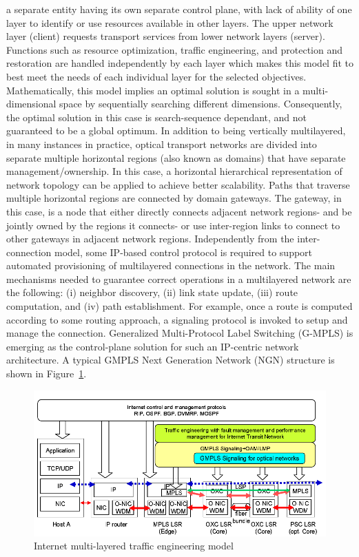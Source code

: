 a separate entity having its own separate control plane, with lack of ability of one layer to identify or use resources available in other layers. The upper network layer (client) requests transport services from lower network layers (server). Functions such as resource optimization, traffic engineering, and protection and restoration are handled independently by each layer which makes this model fit to best meet the needs of each individual layer for the selected objectives. Mathematically, this model implies an optimal solution is sought in a multi-dimensional space by sequentially searching different dimensions. Consequently, the optimal solution in this case is search-sequence dependant, and not guaranteed to be a global optimum.
In addition to being vertically multilayered, in many instances in practice, optical transport networks are divided into separate multiple horizontal regions (also known as domains) that have separate management/ownership. In this case, a horizontal hierarchical representation of network topology can be applied to achieve better scalability. Paths that traverse multiple horizontal regions are connected by domain gateways. The gateway, in this case, is a node that either directly connects adjacent network regions- and be jointly owned by the regions it connects- or use inter-region links to connect to other gateways in adjacent network regions.
Independently from the inter-connection model, some IP-based control protocol is required to support automated provisioning of multilayered connections in the network. The main mechanisms needed to guarantee correct operations in a multilayered network are the following: (i) neighbor discovery, (ii) link state update, (iii) route computation, and (iv) path establishment. For example, once a route is computed according to some routing approach, a signaling protocol is invoked to setup and manage the connection. Generalized Multi-Protocol Label Switching (G-MPLS) is emerging as the control-plane solution for such an IP-centric network architecture. A typical GMPLS Next Generation Network (NGN) structure is shown in Figure~\ref{NetworkModelNGN}.

\begin{figure}[t]
\begin{center}
\includegraphics{Figures/NetworkModelNGN} 
\end{center}
\caption{Internet multi-layered traffic engineering model}
\label{NetworkModelNGN}
\end{figure}

